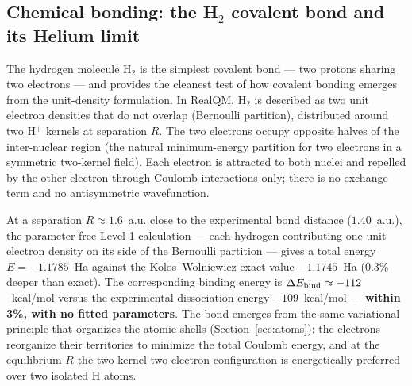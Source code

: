 \documentclass[11pt]{article}
\begin{document}
\subsection{Chemical bonding: the H$_2$ covalent bond and its Helium limit}\label{sec:h2bond}

The hydrogen molecule H$_2$ is the simplest covalent bond --- two protons sharing two electrons --- and provides the cleanest test of how covalent bonding emerges from the unit-density formulation. In RealQM, H$_2$ is described as two unit electron densities that do not overlap (Bernoulli partition), distributed around two H$^+$ kernels at separation $R$. The two electrons occupy opposite halves of the inter-nuclear region (the natural minimum-energy partition for two electrons in a symmetric two-kernel field). Each electron is attracted to both nuclei and repelled by the other electron through Coulomb interactions only; there is no exchange term and no antisymmetric wavefunction.

At a separation $R \approx 1.6$~a.u. close to the experimental bond distance ($1.40$~a.u.), the parameter-free Level-1 calculation --- each hydrogen contributing one unit electron density on its side of the Bernoulli partition --- gives a total energy $E = -1.1785$~Ha against the Kolos--Wolniewicz exact value $-1.1745$~Ha (0.3\% deeper than exact). The corresponding binding energy is $\Delta E_{\rm bind} \approx -112$~kcal/mol versus the experimental dissociation energy $-109$~kcal/mol --- \textbf{within 3\%, with no fitted parameters}. The bond emerges from the same variational principle that organizes the atomic shells (Section~\ref{sec:atoms}): the electrons reorganize their territories to minimize the total Coulomb energy, and at the equilibrium $R$ the two-kernel two-electron configuration is energetically preferred over two isolated H atoms.
\end{document}
